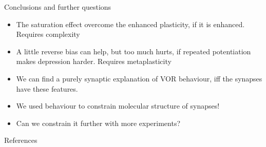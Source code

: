 \documentclass{beamer}%
\begin{document}

\begin{frame}{Conclusions and further questions}
%
 \begin{itemize}
   \item The saturation effect overcome the enhanced plasticity, if it is enhanced.
   \alert{Requires complexity}
   \item A little reverse bias can help, but too much hurts, if repeated potentiation makes depression harder.
   \alert{Requires metaplasticity}
   \item We can find a purely synaptic explanation of VOR behaviour, iff the synapses have these features.
   \item We used behaviour to constrain molecular structure of synapses!
   \item Can we constrain it further with more experiments?
 \end{itemize}
%
\end{frame}

%
%

\begin{frame}[allowframebreaks]{References}
%

 {\small
 
 
 }
%
\end{frame}


\end{document}
